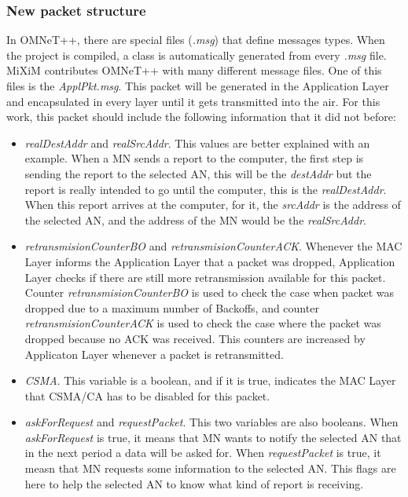 \subsubsection{New packet structure}
\label{sec:packetstructure}

In \ac{OMNeT++}, there are special files (\textit{.msg}) that define messages types. When the project is compiled, a class is automatically 
generated from every \textit{.msg} file. \ac{MiXiM} contributes \ac{OMNeT++} with many different message files. One of this files is the 
\textit{ApplPkt.msg}. This packet will be generated in the Application Layer and encapsulated in every layer until it gets transmitted into the 
air. For this work, this packet should include the following information that it did not before:
\begin{itemize}
 \item \textit{realDestAddr} and \textit{realSrcAddr}. This values are better explained with an example. When a \ac{MN} sends a report to the 
computer, the first step is sending the report to the selected \ac{AN}, this will be the \textit{destAddr} but the report is really intended
to go until the computer, this is the \textit{realDestAddr}. When this report arrives at the computer, for it, the \textit{srcAddr} is the 
address of the selected \ac{AN}, and the address of the \ac{MN} would be the \textit{realSrcAddr}.
 \item \textit{retransmisionCounterBO} and \textit{retransmisionCounterACK}. Whenever the \ac{MAC} Layer informs the Application Layer that a 
packet was dropped, Application Layer checks if there are still more retransmission available for this packet. Counter
\textit{retransmisionCounterBO} is used to check the case when packet was dropped due to a maximum number of Backoffs, and counter 
\textit{retransmisionCounterACK} is used to check the case where the packet was dropped because no \ac{ACK} was received. This counters are
increased by Applicaton Layer whenever a packet is retransmitted.
 \item \textit{CSMA}. This variable is a boolean, and if it is true, indicates the \ac{MAC} Layer that \ac{CSMA/CA} has to be disabled for 
this packet.
 \item \textit{askForRequest} and \textit{requestPacket}. This two variables are also booleans. When \textit{askForRequest} is true, it means
that \ac{MN} wants to notify the selected \ac{AN} that in the next period a data will be asked for. When \textit{requestPacket} is true, it
measn that \ac{MN} requests some information to the selected \ac{AN}. This flags are here to help the selected \ac{AN} to know what kind of 
report is receiving.
\end{itemize}

